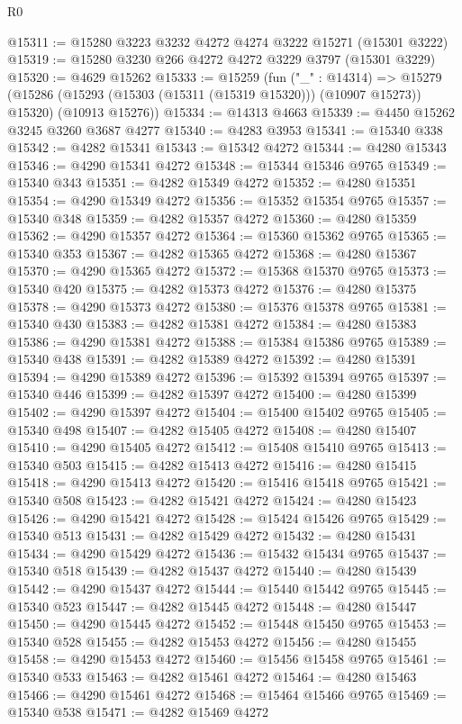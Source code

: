 \begin{lexlean}{R0}
\begin{coremodule}
@15311 := @15280 @3223 @3232 @4272 @4274 @3222 @15271 (@15301 @3222)
@15319 := @15280 @3230 @266 @4272 @4272 @3229 @3797 (@15301 @3229)
@15320 := @4629 @15262
@15333 := @15259
    (fun ("_" : @14314) =>
    @15279
      (@15286 (@15293 (@15303 (@15311 (@15319 @15320))) (@10907 @15273)) @15320)
      (@10913 @15276))
@15334 := @14313 @4663
@15339 := @4450 @15262 @3245 @3260 @3687 @4277
@15340 := @4283 @3953
@15341 := @15340 @338
@15342 := @4282 @15341
@15343 := @15342 @4272
@15344 := @4280 @15343
@15346 := @4290 @15341 @4272
@15348 := @15344 @15346 @9765
@15349 := @15340 @343
@15351 := @4282 @15349 @4272
@15352 := @4280 @15351
@15354 := @4290 @15349 @4272
@15356 := @15352 @15354 @9765
@15357 := @15340 @348
@15359 := @4282 @15357 @4272
@15360 := @4280 @15359
@15362 := @4290 @15357 @4272
@15364 := @15360 @15362 @9765
@15365 := @15340 @353
@15367 := @4282 @15365 @4272
@15368 := @4280 @15367
@15370 := @4290 @15365 @4272
@15372 := @15368 @15370 @9765
@15373 := @15340 @420
@15375 := @4282 @15373 @4272
@15376 := @4280 @15375
@15378 := @4290 @15373 @4272
@15380 := @15376 @15378 @9765
@15381 := @15340 @430
@15383 := @4282 @15381 @4272
@15384 := @4280 @15383
@15386 := @4290 @15381 @4272
@15388 := @15384 @15386 @9765
@15389 := @15340 @438
@15391 := @4282 @15389 @4272
@15392 := @4280 @15391
@15394 := @4290 @15389 @4272
@15396 := @15392 @15394 @9765
@15397 := @15340 @446
@15399 := @4282 @15397 @4272
@15400 := @4280 @15399
@15402 := @4290 @15397 @4272
@15404 := @15400 @15402 @9765
@15405 := @15340 @498
@15407 := @4282 @15405 @4272
@15408 := @4280 @15407
@15410 := @4290 @15405 @4272
@15412 := @15408 @15410 @9765
@15413 := @15340 @503
@15415 := @4282 @15413 @4272
@15416 := @4280 @15415
@15418 := @4290 @15413 @4272
@15420 := @15416 @15418 @9765
@15421 := @15340 @508
@15423 := @4282 @15421 @4272
@15424 := @4280 @15423
@15426 := @4290 @15421 @4272
@15428 := @15424 @15426 @9765
@15429 := @15340 @513
@15431 := @4282 @15429 @4272
@15432 := @4280 @15431
@15434 := @4290 @15429 @4272
@15436 := @15432 @15434 @9765
@15437 := @15340 @518
@15439 := @4282 @15437 @4272
@15440 := @4280 @15439
@15442 := @4290 @15437 @4272
@15444 := @15440 @15442 @9765
@15445 := @15340 @523
@15447 := @4282 @15445 @4272
@15448 := @4280 @15447
@15450 := @4290 @15445 @4272
@15452 := @15448 @15450 @9765
@15453 := @15340 @528
@15455 := @4282 @15453 @4272
@15456 := @4280 @15455
@15458 := @4290 @15453 @4272
@15460 := @15456 @15458 @9765
@15461 := @15340 @533
@15463 := @4282 @15461 @4272
@15464 := @4280 @15463
@15466 := @4290 @15461 @4272
@15468 := @15464 @15466 @9765
@15469 := @15340 @538
@15471 := @4282 @15469 @4272

\end{coremodule}
\end{lexlean}
